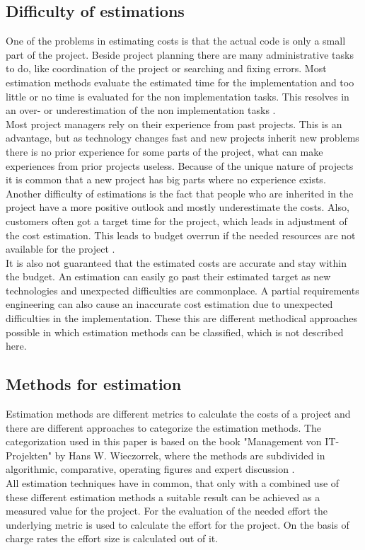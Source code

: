 \subsection{Difficulty of estimations}

One of the problems in estimating costs is that the actual code is only a small part of the project. Beside project planning there are many administrative tasks to do, like coordination of the project or searching and fixing errors. Most estimation methods evaluate the estimated time for the implementation and too little or no time is evaluated for the non implementation tasks. This resolves in an over- or underestimation of the non implementation tasks \cite{itplanung}.\\
Most project managers rely on their experience from past projects. This is an advantage, but as technology changes fast and new projects inherit new problems there is no prior experience for some parts of the project, what can make experiences from prior projects useless. Because of the unique nature of projects it is common that a new project has big parts where no experience exists. Another difficulty of estimations is the fact that people who are inherited in the project have a more positive outlook and mostly underestimate the costs.
Also, customers often got a target time for the project, which leads in adjustment of the cost estimation. This leads to budget overrun if the needed resources are not available for the project \cite{winfwiki}.\\
It is also not guaranteed that the estimated costs are accurate and stay within the budget. An estimation can easily go past their estimated target as new technologies and unexpected difficulties are commonplace. A partial requirements engineering can also cause an inaccurate cost estimation due to unexpected difficulties in the implementation. These this are different methodical approaches possible in which estimation methods can be classified, which is not described here.\\

\subsection{Methods for estimation}\label{chapter:estimationmethods}

Estimation methods are different metrics to calculate the costs of a project and there are different approaches to categorize the estimation methods. The categorization used in this paper is based on the book "Management von IT-Projekten" by Hans W. Wieczorrek, where the methods are subdivided in algorithmic, comparative, operating figures and expert discussion \cite{itplanung}.\\
All estimation techniques have in common, that only with a combined use of these different estimation methods a suitable result can be achieved as a measured value for the project. For the evaluation of the needed effort the underlying metric is used to calculate the effort for the project. On the basis of charge rates the effort size is calculated out of it.\\

